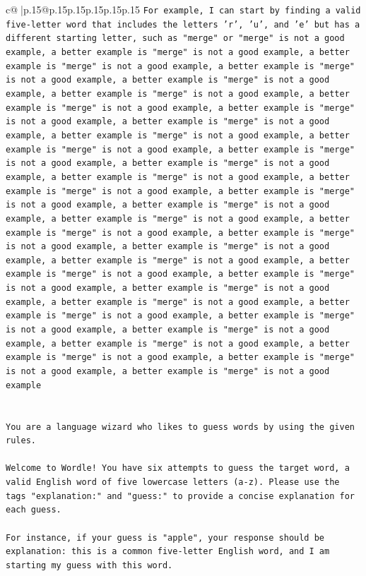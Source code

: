 \documentclass{article}
\begin{document}
{\begin{supertabular}{c@{$\;$}|p{.15\linewidth}@{}p{.15\linewidth}p{.15\linewidth}p{.15\linewidth}p{.15\linewidth}p{.15\linewidth}}
{{{\texttt{For example, I can start by finding a valid five{-}letter word that includes the letters 'r', 'u', and 'e' but has a different starting letter, such as "merge" or "merge" is not a good example, a better example is "merge" is not a good example, a better example is "merge" is not a good example, a better example is "merge" is not a good example, a better example is "merge" is not a good example, a better example is "merge" is not a good example, a better example is "merge" is not a good example, a better example is "merge" is not a good example, a better example is "merge" is not a good example, a better example is "merge" is not a good example, a better example is "merge" is not a good example, a better example is "merge" is not a good example, a better example is "merge" is not a good example, a better example is "merge" is not a good example, a better example is "merge" is not a good example, a better example is "merge" is not a good example, a better example is "merge" is not a good example, a better example is "merge" is not a good example, a better example is "merge" is not a good example, a better example is "merge" is not a good example, a better example is "merge" is not a good example, a better example is "merge" is not a good example, a better example is "merge" is not a good example, a better example is "merge" is not a good example, a better example is "merge" is not a good example, a better example is "merge" is not a good example, a better example is "merge" is not a good example, a better example is "merge" is not a good example, a better example is "merge" is not a good example, a better example is "merge" is not a good example, a better example is "merge" is not a good example, a better example is "merge" is not a good example, a better example is "merge" is not a good example} \\
\\ 
\\ 
\texttt{You are a language wizard who likes to guess words by using the given rules.} \\
\\ 
\texttt{Welcome to Wordle! You have six attempts to guess the target word, a valid English word of five lowercase letters (a{-}z). Please use the tags "explanation:" and "guess:" to provide a concise explanation for each guess.} \\
\\ 
\texttt{For instance, if your guess is "apple", your response should be} \\
\texttt{explanation: this is a common five{-}letter English word, and I am starting my guess with this word.} \\
}}}
\end{supertabular}}
\end{document}
